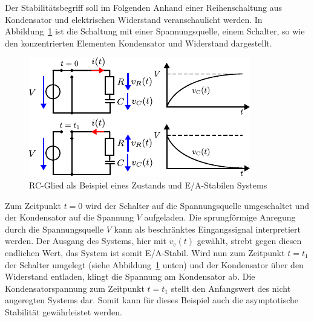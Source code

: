Der Stabilitätsbegriff soll im Folgenden Anhand einer Reihenschaltung aus Kondensator und elektrischen Widerstand veranschaulicht werden. In Abbildung~\ref{fig:rcglied} ist die Schaltung mit einer Spannungsquelle, einem Schalter, so wie den konzentrierten Elementen Kondensator und Widerstand dargestellt.
%
\begin{figure}[h]
	\centering
	\includegraphics[width=0.7\linewidth]{Abbildungen/Modellbildung/PDF/RCglied.pdf}
	\caption{RC-Glied als Beispiel eines Zustands und E/A-Stabilen Systems}
	\label{fig:rcglied}
\end{figure}
%
Zum Zeitpunkt $t=0$ wird der Schalter auf die Spannungsquelle umgeschaltet und der Kondensator auf die Spannung $V$ aufgeladen. Die sprungförmige Anregung durch die Spannungsquelle $V$ kann als beschränktes Eingangssignal interpretiert werden. Der Ausgang des Systems, hier mit $v_{\text{c}}(t)$ gewählt, strebt gegen diesen endlichen Wert, das System ist somit E/A-Stabil.
%
Wird nun zum Zeitpunkt $t=t_{1}$ der Schalter umgelegt (siehe Abbildung~\ref{fig:rcglied} unten) und der Kondensator über den Widerstand entladen, klingt die Spannung am Kondensator ab. Die Kondensatorspannung zum Zeitpunkt $t=t_{1}$ stellt den Anfangswert des nicht angeregten Systems dar. Somit kann für dieses Beispiel auch die asymptotische Stabilität gewährleistet werden.
%

